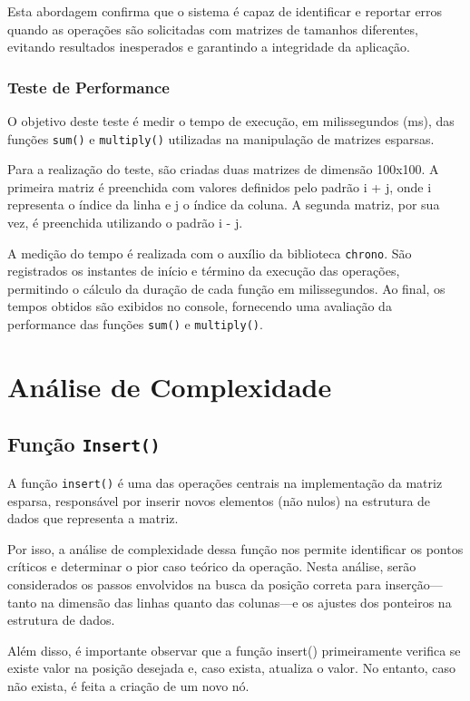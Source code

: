 \documentclass[12pt]{article}
\begin{document}
    Esta abordagem confirma que o sistema é capaz de identificar e reportar erros quando as operações são solicitadas com matrizes de tamanhos diferentes, evitando resultados inesperados e garantindo a integridade da aplicação.
    
    \subsubsection{Teste de Performance}

    O objetivo deste teste é medir o tempo de execução, em milissegundos (ms), das funções \texttt{sum()} e \texttt{multiply()} utilizadas na manipulação de matrizes esparsas.
    
    Para a realização do teste, são criadas duas matrizes de dimensão 100x100. A primeira matriz é preenchida com valores definidos pelo padrão i + j, onde i representa o índice da linha e j o índice da coluna. A segunda matriz, por sua vez, é preenchida utilizando o padrão i - j.
    
    A medição do tempo é realizada com o auxílio da biblioteca \texttt{chrono}. São registrados os instantes de início e término da execução das operações, permitindo o cálculo da duração de cada função em milissegundos. Ao final, os tempos obtidos são exibidos no console, fornecendo uma avaliação da performance das funções \texttt{sum()} e \texttt{multiply()}.
    
\section{Análise de Complexidade}
    \subsection{Função \texttt{Insert()}}

    A função \texttt{insert()} é uma das operações centrais na implementação da matriz esparsa, responsável por inserir novos elementos (não nulos) na estrutura de dados que representa a matriz. 
    
    Por isso, a análise de complexidade dessa função nos permite identificar os pontos críticos e determinar o pior caso teórico da operação. Nesta análise, serão considerados os passos envolvidos na busca da posição correta para inserção—tanto na dimensão das linhas quanto das colunas—e os ajustes dos ponteiros na estrutura de dados. 
    
    Além disso, é importante observar que a função insert() primeiramente verifica se existe valor na posição desejada e, caso exista, atualiza o valor. No entanto, caso não exista, é feita a criação de um novo nó.
\end{document}
